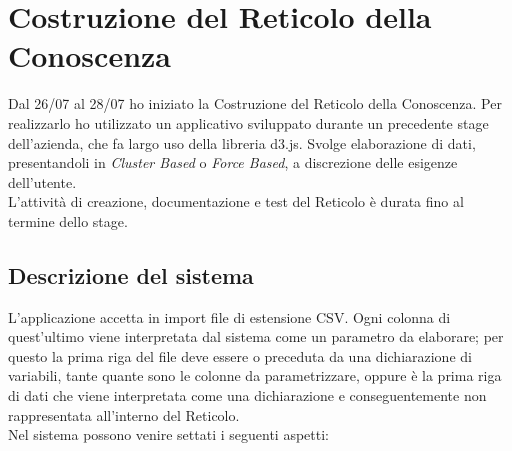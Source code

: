 \section{Costruzione del Reticolo della Conoscenza}
\label{Costruzione del Reticolo della Conoscenza}
Dal 26/07 al 28/07 ho iniziato la Costruzione del Reticolo della Conoscenza. Per realizzarlo ho utilizzato un applicativo sviluppato durante un precedente stage dell'azienda, che fa largo uso della libreria d3.js. Svolge elaborazione di dati, presentandoli in \textit{Cluster Based} o \textit{Force Based}, a discrezione delle esigenze dell'utente.\\
L'attivit\`a di creazione, documentazione e test del Reticolo \`e durata fino al termine dello stage.

\subsection{Descrizione del sistema}
\label{Descrizione del sistema}
L'applicazione accetta in import file di estensione CSV. Ogni colonna di quest'ultimo viene interpretata dal sistema come un parametro da elaborare; per questo la prima riga del file deve essere o preceduta da una dichiarazione di variabili, tante quante sono le colonne da parametrizzare, oppure \`e la prima riga di dati che viene interpretata come una dichiarazione e conseguentemente non rappresentata all'interno del Reticolo.\\
Nel sistema possono venire settati i seguenti aspetti:
